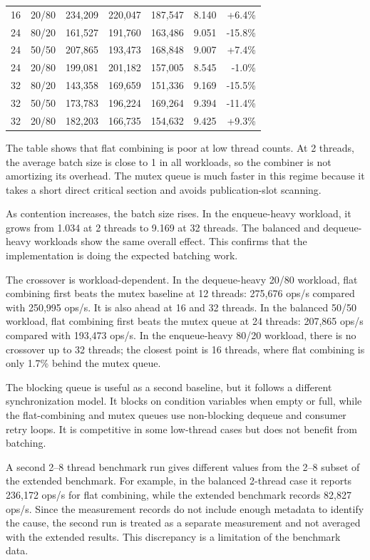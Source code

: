 \documentclass[11pt,a4paper]{article}
\begin{document}
\begin{table}[htbp]
\begin{tabular}{@{}r l r r r r r@{}}
16 & 20/80 & 234,209 & 220,047 & 187,547 & 8.140 & +6.4\% \\
24 & 80/20 & 161,527 & 191,760 & 163,486 & 9.051 & -15.8\% \\
24 & 50/50 & 207,865 & 193,473 & 168,848 & 9.007 & +7.4\% \\
24 & 20/80 & 199,081 & 201,182 & 157,005 & 8.545 & -1.0\% \\
32 & 80/20 & 143,358 & 169,659 & 151,336 & 9.169 & -15.5\% \\
32 & 50/50 & 173,783 & 196,224 & 169,264 & 9.394 & -11.4\% \\
32 & 20/80 & 182,203 & 166,735 & 154,632 & 9.425 & +9.3\% \\
\bottomrule
\end{tabular}
\end{table}

The table shows that flat combining is poor at low thread counts. At 2 threads, the average batch size is close to 1 in all workloads, so the combiner is not amortizing its overhead. The mutex queue is much faster in this regime because it takes a short direct critical section and avoids publication-slot scanning.

As contention increases, the batch size rises. In the enqueue-heavy workload, it grows from 1.034 at 2 threads to 9.169 at 32 threads. The balanced and dequeue-heavy workloads show the same overall effect. This confirms that the implementation is doing the expected batching work.

The crossover is workload-dependent. In the dequeue-heavy 20/80 workload, flat combining first beats the mutex baseline at 12 threads: 275,676 ops/s compared with 250,995 ops/s. It is also ahead at 16 and 32 threads. In the balanced 50/50 workload, flat combining first beats the mutex queue at 24 threads: 207,865 ops/s compared with 193,473 ops/s. In the enqueue-heavy 80/20 workload, there is no crossover up to 32 threads; the closest point is 16 threads, where flat combining is only 1.7\% behind the mutex queue.

The blocking queue is useful as a second baseline, but it follows a different synchronization model. It blocks on condition variables when empty or full, while the flat-combining and mutex queues use non-blocking dequeue and consumer retry loops. It is competitive in some low-thread cases but does not benefit from batching.

A second 2--8 thread benchmark run gives different values from the 2--8 subset of the extended benchmark. For example, in the balanced 2-thread case it reports 236,172 ops/s for flat combining, while the extended benchmark records 82,827 ops/s. Since the measurement records do not include enough metadata to identify the cause, the second run is treated as a separate measurement and not averaged with the extended results. This discrepancy is a limitation of the benchmark data.
\end{document}
